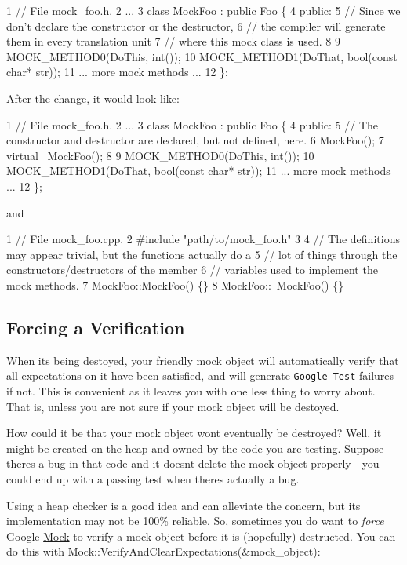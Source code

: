 \begin{DoxyCode}
1 // File mock\_foo.h.
2 ...
3 class MockFoo : public Foo \{
4  public:
5   // Since we don't declare the constructor or the destructor,
6   // the compiler will generate them in every translation unit
7   // where this mock class is used.
8 
9   MOCK\_METHOD0(DoThis, int());
10   MOCK\_METHOD1(DoThat, bool(const char* str));
11   ... more mock methods ...
12 \};
\end{DoxyCode}


After the change, it would look like\+:


\begin{DoxyCode}
1 // File mock\_foo.h.
2 ...
3 class MockFoo : public Foo \{
4  public:
5   // The constructor and destructor are declared, but not defined, here.
6   MockFoo();
7   virtual ~MockFoo();
8 
9   MOCK\_METHOD0(DoThis, int());
10   MOCK\_METHOD1(DoThat, bool(const char* str));
11   ... more mock methods ...
12 \};
\end{DoxyCode}
 and 
\begin{DoxyCode}
1 // File mock\_foo.cpp.
2 #include "path/to/mock\_foo.h"
3 
4 // The definitions may appear trivial, but the functions actually do a
5 // lot of things through the constructors/destructors of the member
6 // variables used to implement the mock methods.
7 MockFoo::MockFoo() \{\}
8 MockFoo::~MockFoo() \{\}
\end{DoxyCode}


\subsection*{Forcing a Verification}

When it\textquotesingle{}s being destoyed, your friendly mock object will automatically verify that all expectations on it have been satisfied, and will generate \href{http://code.google.com/p/googletest/}{\tt Google Test} failures if not. This is convenient as it leaves you with one less thing to worry about. That is, unless you are not sure if your mock object will be destoyed.

How could it be that your mock object won\textquotesingle{}t eventually be destroyed? Well, it might be created on the heap and owned by the code you are testing. Suppose there\textquotesingle{}s a bug in that code and it doesn\textquotesingle{}t delete the mock object properly -\/ you could end up with a passing test when there\textquotesingle{}s actually a bug.

Using a heap checker is a good idea and can alleviate the concern, but its implementation may not be 100\% reliable. So, sometimes you do want to {\itshape force} Google \hyperlink{class_mock}{Mock} to verify a mock object before it is (hopefully) destructed. You can do this with {\ttfamily Mock\+::\+Verify\+And\+Clear\+Expectations(\&mock\+\_\+object)}\+:


